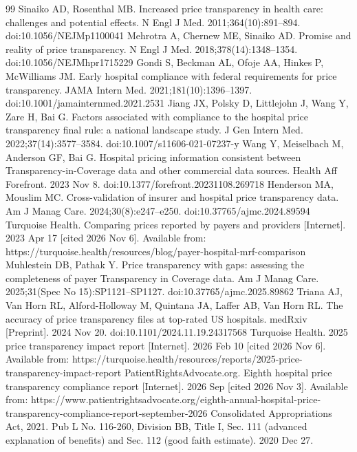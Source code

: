 \documentclass[10pt]{article}
\begin{document}
\begin{thebibliography}{99}
 Sinaiko AD, Rosenthal MB. Increased price transparency in health care: challenges and potential effects. N Engl J Med. 2011;364(10):891--894. doi:10.1056/NEJMp1100041
 Mehrotra A, Chernew ME, Sinaiko AD. Promise and reality of price transparency. N Engl J Med. 2018;378(14):1348--1354. doi:10.1056/NEJMhpr1715229
 Gondi S, Beckman AL, Ofoje AA, Hinkes P, McWilliams JM. Early hospital compliance with federal requirements for price transparency. JAMA Intern Med. 2021;181(10):1396--1397. doi:10.1001/jamainternmed.2021.2531
 Jiang JX, Polsky D, Littlejohn J, Wang Y, Zare H, Bai G. Factors associated with compliance to the hospital price transparency final rule: a national landscape study. J Gen Intern Med. 2022;37(14):3577--3584. doi:10.1007/s11606-021-07237-y
 Wang Y, Meiselbach M, Anderson GF, Bai G. Hospital pricing information consistent between Transparency-in-Coverage data and other commercial data sources. Health Aff Forefront. 2023 Nov 8. doi:10.1377/forefront.20231108.269718
 Henderson MA, Mouslim MC. Cross-validation of insurer and hospital price transparency data. Am J Manag Care. 2024;30(8):e247--e250. doi:10.37765/ajmc.2024.89594
 Turquoise Health. Comparing prices reported by payers and providers [Internet]. 2023 Apr 17 [cited 2026 Nov 6]. Available from: https://turquoise.health/resources/blog/payer-hospital-mrf-comparison
 Muhlestein DB, Pathak Y. Price transparency with gaps: assessing the completeness of payer Transparency in Coverage data. Am J Manag Care. 2025;31(Spec No 15):SP1121--SP1127. doi:10.37765/ajmc.2025.89862
 Triana AJ, Van Horn RL, Alford-Holloway M, Quintana JA, Laffer AB, Van Horn RL. The accuracy of price transparency files at top-rated US hospitals. medRxiv [Preprint]. 2024 Nov 20. doi:10.1101/2024.11.19.24317568
 Turquoise Health. 2025 price transparency impact report [Internet]. 2026 Feb 10 [cited 2026 Nov 6]. Available from: https://turquoise.health/resources/reports/2025-price-transparency-impact-report
 PatientRightsAdvocate.org. Eighth hospital price transparency compliance report [Internet]. 2026 Sep [cited 2026 Nov 3]. Available from: https://www.patientrightsadvocate.org/eighth-annual-hospital-price-transparency-compliance-report-september-2026
 Consolidated Appropriations Act, 2021. Pub L No. 116-260, Division BB, Title I, Sec. 111 (advanced explanation of benefits) and Sec. 112 (good faith estimate). 2020 Dec 27.

\end{thebibliography}
\end{document}

